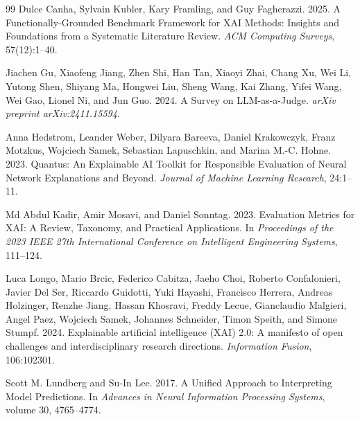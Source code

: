 \documentclass[twoside,11pt]{article}
\begin{document}
\begin{thebibliography}{99}
Dulce Canha, Sylvain Kubler, Kary Framling, and Guy Fagherazzi.
2025.
A Functionally-Grounded Benchmark Framework for XAI Methods: Insights and Foundations from a Systematic Literature Review.
\emph{ACM Computing Surveys}, 57(12):1--40.

Jiachen Gu, Xiaofeng Jiang, Zhen Shi, Han Tan, Xiaoyi Zhai, Chang Xu,
Wei Li, Yutong Shen, Shiyang Ma, Hongwei Liu, Sheng Wang, Kai Zhang,
Yifei Wang, Wei Gao, Lionel Ni, and Jun Guo.
2024.
A Survey on LLM-as-a-Judge.
\emph{arXiv preprint arXiv:2411.15594}.

Anna Hedstrom, Leander Weber, Dilyara Bareeva, Daniel Krakowczyk,
Franz Motzkus, Wojciech Samek, Sebastian Lapuschkin, and Marina M.-C. Hohne.
2023.
Quantus: An Explainable AI Toolkit for Responsible Evaluation of Neural Network Explanations and Beyond.
\emph{Journal of Machine Learning Research}, 24:1--11.

Md Abdul Kadir, Amir Mosavi, and Daniel Sonntag.
2023.
Evaluation Metrics for XAI: A Review, Taxonomy, and Practical Applications.
In \emph{Proceedings of the 2023 IEEE 27th International Conference on Intelligent Engineering Systems}, 111--124.

Luca Longo, Mario Brcic, Federico Cabitza, Jaeho Choi, Roberto Confalonieri,
Javier Del Ser, Riccardo Guidotti, Yuki Hayashi, Francisco Herrera,
Andreas Holzinger, Renzhe Jiang, Hassan Khosravi, Freddy Lecue,
Gianclaudio Malgieri, Angel Paez, Wojciech Samek, Johannes Schneider,
Timon Speith, and Simone Stumpf.
2024.
Explainable artificial intelligence (XAI) 2.0: A manifesto of open challenges and interdisciplinary research directions.
\emph{Information Fusion}, 106:102301.

Scott M. Lundberg and Su-In Lee.
2017.
A Unified Approach to Interpreting Model Predictions.
In \emph{Advances in Neural Information Processing Systems}, volume 30,
4765--4774.


\end{thebibliography}
\end{document}
